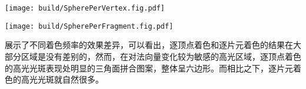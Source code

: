 \begin{Figure}[着色频率的效果]
    \begin{FigureSub}[逐顶点着色的效果]
        \texttt{[image: build/SpherePerVertex.fig.pdf]}
    \end{FigureSub}
    \hspace{0.5cm}
    \begin{FigureSub}[逐片元着色的效果]
        \texttt{[image: build/SpherePerFragment.fig.pdf]}
    \end{FigureSub}
\end{Figure}

展示了不同着色频率的效果差异，可以看出，逐顶点着色和逐片元着色的结果在大部分区域是没有差别的，然而，在对法向量变化较为敏感的高光区域，逐顶点着色的高光光斑表现处明显的三角面拼合图案，整体呈六边形。而相比之下，逐片元着色的高光光斑就自然很多。